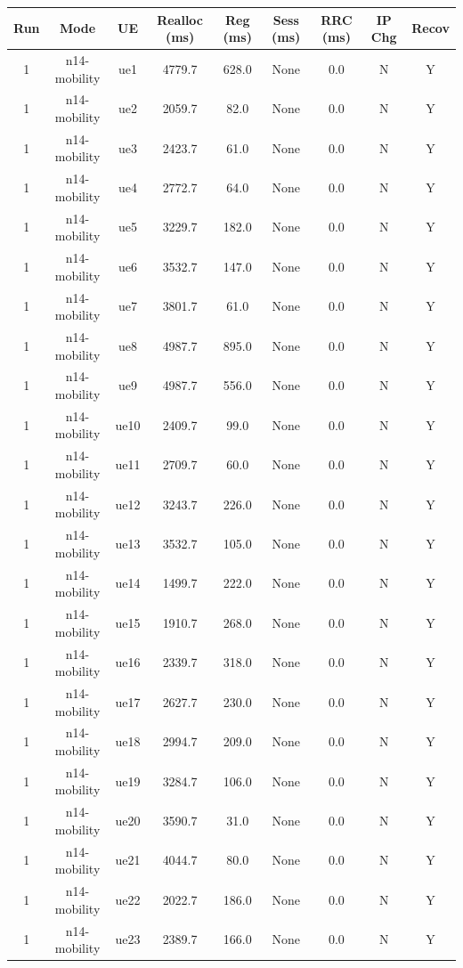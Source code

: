 \begin{table}[ht]
\centering
\begin{tabular}{|c|c|c|c|c|c|c|c|c|}
\hline
Run & Mode & UE & Realloc (ms) & Reg (ms) & Sess (ms) & RRC (ms) & IP Chg & Recov \\
\hline
1 & n14-mobility & ue1 & 4779.7 & 628.0 & None & 0.0 & N & Y \\
1 & n14-mobility & ue2 & 2059.7 & 82.0 & None & 0.0 & N & Y \\
1 & n14-mobility & ue3 & 2423.7 & 61.0 & None & 0.0 & N & Y \\
1 & n14-mobility & ue4 & 2772.7 & 64.0 & None & 0.0 & N & Y \\
1 & n14-mobility & ue5 & 3229.7 & 182.0 & None & 0.0 & N & Y \\
1 & n14-mobility & ue6 & 3532.7 & 147.0 & None & 0.0 & N & Y \\
1 & n14-mobility & ue7 & 3801.7 & 61.0 & None & 0.0 & N & Y \\
1 & n14-mobility & ue8 & 4987.7 & 895.0 & None & 0.0 & N & Y \\
1 & n14-mobility & ue9 & 4987.7 & 556.0 & None & 0.0 & N & Y \\
1 & n14-mobility & ue10 & 2409.7 & 99.0 & None & 0.0 & N & Y \\
1 & n14-mobility & ue11 & 2709.7 & 60.0 & None & 0.0 & N & Y \\
1 & n14-mobility & ue12 & 3243.7 & 226.0 & None & 0.0 & N & Y \\
1 & n14-mobility & ue13 & 3532.7 & 105.0 & None & 0.0 & N & Y \\
1 & n14-mobility & ue14 & 1499.7 & 222.0 & None & 0.0 & N & Y \\
1 & n14-mobility & ue15 & 1910.7 & 268.0 & None & 0.0 & N & Y \\
1 & n14-mobility & ue16 & 2339.7 & 318.0 & None & 0.0 & N & Y \\
1 & n14-mobility & ue17 & 2627.7 & 230.0 & None & 0.0 & N & Y \\
1 & n14-mobility & ue18 & 2994.7 & 209.0 & None & 0.0 & N & Y \\
1 & n14-mobility & ue19 & 3284.7 & 106.0 & None & 0.0 & N & Y \\
1 & n14-mobility & ue20 & 3590.7 & 31.0 & None & 0.0 & N & Y \\
1 & n14-mobility & ue21 & 4044.7 & 80.0 & None & 0.0 & N & Y \\
1 & n14-mobility & ue22 & 2022.7 & 186.0 & None & 0.0 & N & Y \\
1 & n14-mobility & ue23 & 2389.7 & 166.0 & None & 0.0 & N & Y \\

\end{tabular}
\end{table}
